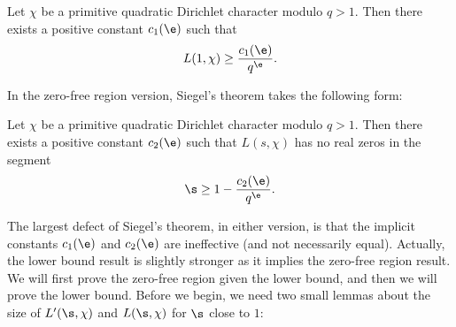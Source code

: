     \begin{theorem}
      Let $\chi$ be a primitive quadratic Dirichlet character modulo $q > 1$. Then there exists a positive constant $c_{1}(\e)$ such that
      \[
        L(1,\chi) \ge \frac{c_{1}(\e)}{q^{\e}}.
      \]
    \end{theorem}

    In the zero-free region version, Siegel's theorem takes the following form:

    \begin{theorem}
      Let $\chi$ be a primitive quadratic Dirichlet character modulo $q > 1$. Then there exists a positive constant $c_{2}(\e)$ such that $L(s,\chi)$ has no real zeros in the segment
      \[
        \s \ge 1-\frac{c_{2}(\e)}{q^{\e}}.
      \]
    \end{theorem}

    The largest defect of Siegel's theorem, in either version, is that the implicit constants $c_{1}(\e)$ and $c_{2}(\e)$ are ineffective (and not necessarily equal). Actually, the lower bound result is slightly stronger as it implies the zero-free region result. We will first prove the zero-free region given the lower bound, and then we will prove the lower bound. Before we begin, we need two small lemmas about the size of $L'(\s,\chi)$ and $L(\s,\chi)$ for $\s$ close to $1$:

